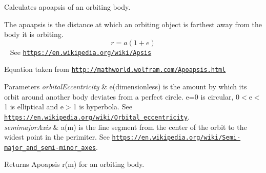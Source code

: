Calculates apoapsis of an orbiting body. 

The apoapsis is the distance at which an orbiting object is farthest away from the body it is orbiting. \[r=a(1+e)\] ~\newline
See \href{https://en.wikipedia.org/wiki/Apsis}{\tt https\+://en.\+wikipedia.\+org/wiki/\+Apsis}

Equation taken from \href{http://mathworld.wolfram.com/Apoapsis.html}{\tt http\+://mathworld.\+wolfram.\+com/\+Apoapsis.\+html}


\begin{DoxyParams}{Parameters}
{\em orbital\+Eccentricity} & e(dimensionless) is the amount by which its orbit around another body deviates from a perfect circle. e=0 is circular, 0$<$e$<$1 is elliptical and e$>$1 is hyperbola. See \href{https://en.wikipedia.org/wiki/Orbital_eccentricity}{\tt https\+://en.\+wikipedia.\+org/wiki/\+Orbital\+\_\+eccentricity}. \\
\hline
{\em semimajor\+Axis} & a(m) is the line segment from the center of the orbit to the widest point in the perimiter. See \href{https://en.wikipedia.org/wiki/Semi-major_and_semi-minor_axes}{\tt https\+://en.\+wikipedia.\+org/wiki/\+Semi-\/major\+\_\+and\+\_\+semi-\/minor\+\_\+axes}. \\
\hline
\end{DoxyParams}
\begin{DoxyReturn}{Returns}
Apoapsis r(m) for an orbiting body. 
\end{DoxyReturn}
